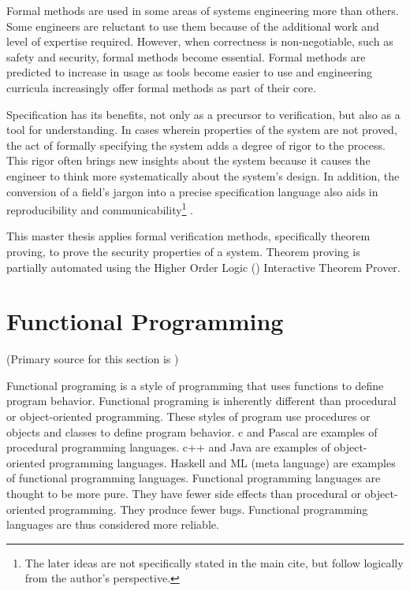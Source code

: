 \documentclass[../../main/main.tex]{subfiles}
\begin{document}
Formal methods are used in some areas of systems engineering more than others.  Some engineers are reluctant to use them because of the additional work and level of expertise required.  However, when correctness is non-negotiable, such as safety and security, formal methods become essential.  Formal methods are predicted to increase in usage as tools become easier to use and engineering curricula increasingly offer formal methods as part of their core\cite{formalCarnegie}.

Specification has its benefits, not only as a precursor to verification, but also as a tool for understanding.  In cases wherein properties of the system are not proved, the act of formally specifying the system adds a degree of rigor to the process. This rigor often brings new insights about the system because it causes the engineer to think more systematically about the system's design.  In addition, the conversion of a field's jargon into a precise specification language also aids in reproducibility and communicability\footnote{The later ideas are not specifically stated in the main cite, but follow logically from the author's perspective.} \cite{formalCarnegie}.  

This master thesis applies formal verification methods, specifically theorem proving, to prove the security properties of a system.  Theorem proving is partially automated using the Higher Order Logic () Interactive Theorem Prover. 

\section{Functional Programming}
(Primary source for this section is \cite{functionalprogramming})

Functional programing is a style of programming that uses functions to define program behavior.  Functional programing is inherently different than procedural or object-oriented programming. These styles of program use procedures or objects and classes to define program behavior.  c  and Pascal are examples of procedural programming languages.  c++ and Java are examples of object-oriented programming languages.  Haskell and ML (meta language) are examples of functional programming languages.  Functional programming languages are thought to be more pure.  They have fewer side effects than procedural or object-oriented programming.  They produce fewer bugs.  Functional programming languages are thus considered more reliable.   
\end{document}

